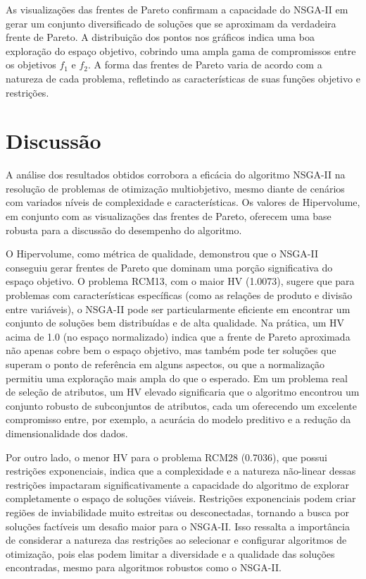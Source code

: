 \documentclass[12pt,openright,oneside,a4paper,english,brazil]{abntex2}
\begin{document}
As visualizações das frentes de Pareto confirmam a capacidade do NSGA-II em gerar um conjunto diversificado de soluções que se aproximam da verdadeira frente de Pareto. A distribuição dos pontos nos gráficos indica uma boa exploração do espaço objetivo, cobrindo uma ampla gama de compromissos entre os objetivos $f_1$ e $f_2$. A forma das frentes de Pareto varia de acordo com a natureza de cada problema, refletindo as características de suas funções objetivo e restrições.


\chapter{Discussão}
A análise dos resultados obtidos corrobora a eficácia do algoritmo NSGA-II \cite{deb2002fast, verma2021comprehensive, ma2023comprehensive} na resolução de problemas de otimização multiobjetivo, mesmo diante de cenários com variados níveis de complexidade e características. Os valores de Hipervolume, em conjunto com as visualizações das frentes de Pareto, oferecem uma base robusta para a discussão do desempenho do algoritmo.

O Hipervolume, como métrica de qualidade, demonstrou que o NSGA-II conseguiu gerar frentes de Pareto que dominam uma porção significativa do espaço objetivo. O problema RCM13, com o maior HV (1.0073), sugere que para problemas com características específicas (como as relações de produto e divisão entre variáveis), o NSGA-II pode ser particularmente eficiente em encontrar um conjunto de soluções bem distribuídas e de alta qualidade. Na prática, um HV acima de 1.0 (no espaço normalizado) indica que a frente de Pareto aproximada não apenas cobre bem o espaço objetivo, mas também pode ter soluções que superam o ponto de referência em alguns aspectos, ou que a normalização permitiu uma exploração mais ampla do que o esperado. Em um problema real de seleção de atributos, um HV elevado significaria que o algoritmo encontrou um conjunto robusto de subconjuntos de atributos, cada um oferecendo um excelente compromisso entre, por exemplo, a acurácia do modelo preditivo e a redução da dimensionalidade dos dados.

Por outro lado, o menor HV para o problema RCM28 (0.7036), que possui restrições exponenciais, indica que a complexidade e a natureza não-linear dessas restrições impactaram significativamente a capacidade do algoritmo de explorar completamente o espaço de soluções viáveis. Restrições exponenciais podem criar regiões de inviabilidade muito estreitas ou desconectadas, tornando a busca por soluções factíveis um desafio maior para o NSGA-II. Isso ressalta a importância de considerar a natureza das restrições ao selecionar e configurar algoritmos de otimização, pois elas podem limitar a diversidade e a qualidade das soluções encontradas, mesmo para algoritmos robustos como o NSGA-II.
\end{document}
